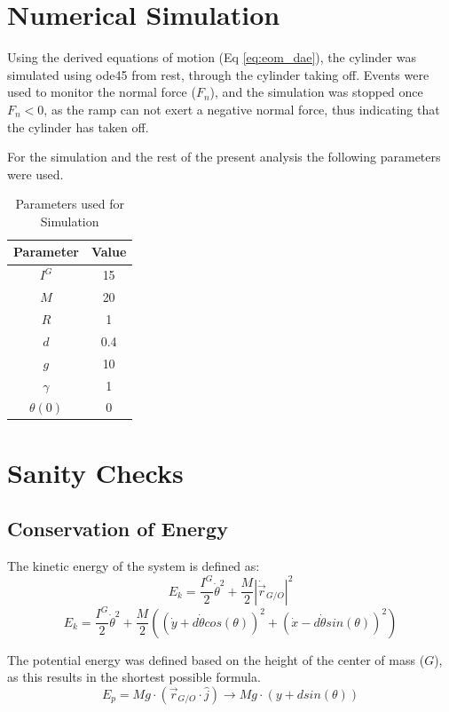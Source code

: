 \documentclass[12pt]{article}
\let\Oldsection\section
\renewcommand{\section}{\FloatBarrier\Oldsection}
\let\Oldsubsection\subsection
\renewcommand{\subsection}{\FloatBarrier\Oldsubsection}
\begin{document}
\section{Numerical Simulation}
Using the derived equations of motion (Eq \ref{eq:eom_dae}), the cylinder was simulated using ode45 from rest, through the cylinder taking off.
Events were used to monitor the normal force ($F_n$), and the simulation was stopped once $F_n < 0$, as the ramp can not exert a negative normal force, thus indicating that the cylinder has taken off.

For the simulation and the rest of the present analysis the following parameters were used.
\begin{table}[h]
\centering
\begin{tabular}{cc}
Parameter	&	Value \\\hline
$I^G$		& 15 \\
$M$			& 20 \\
$R$			& 1  \\
$d$			& 0.4\\
$g$			& 10 \\
$\gamma$	& 1  \\
$\theta(0)$	& 0  \\\hline
\end{tabular}
\caption{Parameters used for Simulation}
\label{tab:SimParameters}
\end{table}

\section{Sanity Checks}
\subsection{Conservation of Energy}

The kinetic energy of the system is defined as:
\begin{equation}
E_k = \frac{I^G}{2}  \dot{\theta}^2 + \frac{M}{2} \left|\dot{\vec{r}}_{G/O} \right|^2
\end{equation}
\begin{equation}
E_k = 
\frac{I^G}{2}\dot{\theta}^2 +
\frac{M}{2} \left(
	\left( \dot{y} + d\dot{\theta} cos(\theta) \right)^2 +
	\left( \dot{x} - d\dot{\theta} sin(\theta) \right)^2
\right)
\end{equation}

The potential energy was defined based on the height of the center of mass ($G$), as this results in the shortest possible formula.
\begin{equation}
E_p = M g \cdot (\vec{r}_{G/O} \cdot \hat{j}) \to M g \cdot \left(y + d sin(\theta) \right)
\end{equation}
\end{document}
